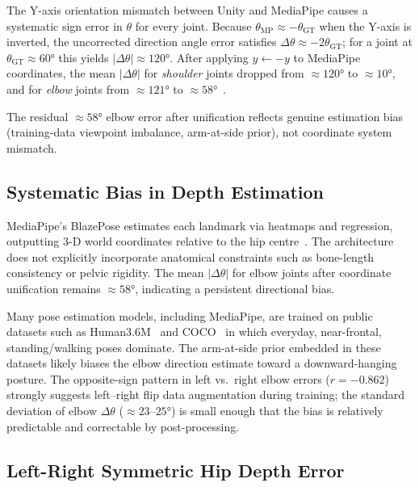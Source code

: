 \documentclass[twocolumn]{article}
\begin{document}
The Y-axis orientation mismatch between Unity and MediaPipe causes a
systematic sign error in $\theta$ for every joint. Because
$\theta_{\text{MP}} \approx -\theta_{\text{GT}}$ when the Y-axis is
inverted, the uncorrected direction angle error satisfies
$\Delta\theta \approx -2\theta_{\text{GT}}$; for a joint at
$\theta_{\text{GT}} \approx 60°$ this yields $|\Delta\theta| \approx 120°$.
After applying $y \leftarrow -y$ to MediaPipe coordinates, the mean
$|\Delta\theta|$ for \emph{shoulder} joints dropped from $\approx120°$ to
$\approx10°$, and for \emph{elbow} joints from $\approx121°$ to
$\approx58°$~\cite{mediapipe_coord_issue}.


The residual $\approx58°$ elbow error after unification reflects genuine
estimation bias (training-data viewpoint imbalance, arm-at-side prior),
not coordinate system mismatch.

\subsection{Systematic Bias in Depth Estimation}

MediaPipe's BlazePose estimates each landmark via heatmaps and regression,
outputting 3-D world coordinates relative to the hip
centre~\cite{blazepose}. The architecture does not explicitly incorporate
anatomical constraints such as bone-length consistency or pelvic
rigidity. The mean $|\Delta\theta|$ for elbow joints after coordinate
unification remains $\approx58°$, indicating a persistent directional bias.

Many pose estimation models, including MediaPipe, are trained on public
datasets such as Human3.6M~\cite{h36m} and COCO~\cite{coco} in which
everyday, near-frontal, standing/walking poses dominate. The arm-at-side
prior embedded in these datasets likely biases the elbow direction estimate
toward a downward-hanging posture. The opposite-sign pattern in left vs.\
right elbow errors ($r=-0.862$) strongly suggests left–right flip data
augmentation during training; the standard deviation of elbow $\Delta\theta$
($\approx23$–$25°$) is small enough that the bias is relatively
predictable and correctable by post-processing.

\subsection{Left-Right Symmetric Hip Depth Error}
\end{document}
